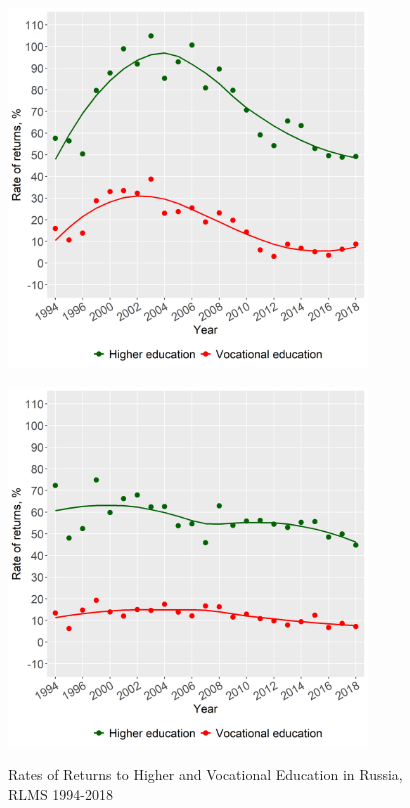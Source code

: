 \documentclass[12pt,a4paper]{article}
\numberwithin{equation}{section}
\begin{document}
\begin{figure}[H]
  \begin{minipage}[b]{.5\linewidth}
     \centering
     \hspace*{-0.7in}
     \includegraphics[width=270pt]{p2a.png}
     \label{fig:2a}
  \end{minipage}
  \hfill
  \begin{minipage}[b]{.5\linewidth}
     \centering
     \hspace*{0in}
     \includegraphics[width=270pt]{p2b.png}
     \label{fig:2b}
  \end{minipage}
  \caption{Rates of Returns to Higher and Vocational Education in Russia, RLMS 1994-2018}\label{fig:2}
\end{figure}
\end{document}
